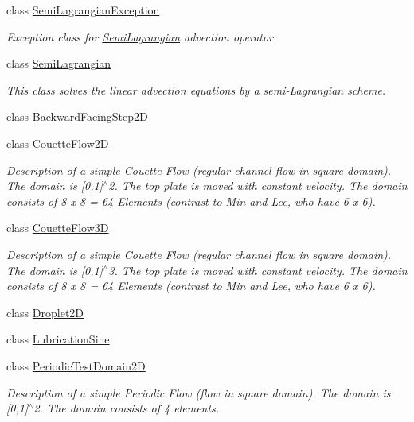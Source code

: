 \begin{DoxyCompactItemize}
class \hyperlink{classnatrium_1_1SemiLagrangianException}{SemiLagrangianException}
\begin{DoxyCompactList}\small\item\em Exception class for \hyperlink{classnatrium_1_1SemiLagrangian}{SemiLagrangian} advection operator. \item\end{DoxyCompactList}\item 
class \hyperlink{classnatrium_1_1SemiLagrangian}{SemiLagrangian}
\begin{DoxyCompactList}\small\item\em This class solves the linear advection equations by a semi-\/Lagrangian scheme. \item\end{DoxyCompactList}\item 
class \hyperlink{classnatrium_1_1BackwardFacingStep2D}{BackwardFacingStep2D}
\item 
class \hyperlink{classnatrium_1_1CouetteFlow2D}{CouetteFlow2D}
\begin{DoxyCompactList}\small\item\em Description of a simple Couette Flow (regular channel flow in square domain). The domain is \mbox{[}0,1\mbox{]}$^\wedge$2. The top plate is moved with constant velocity. The domain consists of 8 x 8 = 64 Elements (contrast to Min and Lee, who have 6 x 6). \item\end{DoxyCompactList}\item 
class \hyperlink{classnatrium_1_1CouetteFlow3D}{CouetteFlow3D}
\begin{DoxyCompactList}\small\item\em Description of a simple Couette Flow (regular channel flow in square domain). The domain is \mbox{[}0,1\mbox{]}$^\wedge$3. The top plate is moved with constant velocity. The domain consists of 8 x 8 = 64 Elements (contrast to Min and Lee, who have 6 x 6). \item\end{DoxyCompactList}\item 
class \hyperlink{classnatrium_1_1Droplet2D}{Droplet2D}
\item 
class \hyperlink{classnatrium_1_1LubricationSine}{LubricationSine}
\item 
class \hyperlink{classnatrium_1_1PeriodicTestDomain2D}{PeriodicTestDomain2D}
\begin{DoxyCompactList}\small\item\em Description of a simple Periodic Flow (flow in square domain). The domain is \mbox{[}0,1\mbox{]}$^\wedge$2. The domain consists of 4 elements. \item\end{DoxyCompactList}\item 

\end{DoxyCompactItemize}
